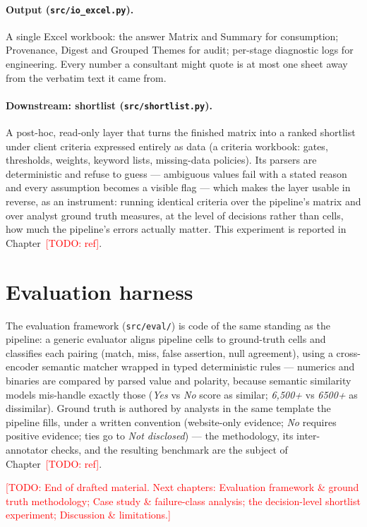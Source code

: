 \documentclass[11pt,a4paper]{report}
\newcommand{\todo}[1]{\textcolor{red}{[TODO: #1]}}
\begin{document}
\paragraph{Output (\texttt{src/io\_excel.py}).} A single Excel workbook:
the answer Matrix and Summary for consumption; Provenance, Digest and
Grouped Themes for audit; per-stage diagnostic logs for engineering. Every
number a consultant might quote is at most one sheet away from the verbatim
text it came from.

\paragraph{Downstream: shortlist (\texttt{src/shortlist.py}).} A post-hoc,
read-only layer that turns the finished matrix into a ranked shortlist under
client criteria expressed entirely as data (a criteria workbook: gates,
thresholds, weights, keyword lists, missing-data policies). Its parsers are
deterministic and refuse to guess --- ambiguous values fail with a stated
reason and every assumption becomes a visible flag --- which makes the layer
usable in reverse, as an instrument: running identical criteria over the
pipeline's matrix and over analyst ground truth measures, at the level of
decisions rather than cells, how much the pipeline's errors actually matter.
This experiment is reported in Chapter~\todo{ref}.

\section{Evaluation harness}
\label{sec:eval-harness}

The evaluation framework (\texttt{src/eval/}) is code of the same standing
as the pipeline: a generic evaluator aligns pipeline cells to ground-truth
cells and classifies each pairing (match, miss, false assertion, null
agreement), using a cross-encoder semantic matcher wrapped in typed
deterministic rules --- numerics and binaries are compared by parsed value
and polarity, because semantic similarity models mis-handle exactly those
(\emph{Yes} vs \emph{No} score as similar; \emph{6{,}500+} vs \emph{6500+}
as dissimilar). Ground truth is authored by analysts in the same template
the pipeline fills, under a written convention (website-only evidence;
\emph{No} requires positive evidence; ties go to \emph{Not disclosed}) ---
the methodology, its inter-annotator checks, and the resulting benchmark
are the subject of Chapter~\todo{ref}.

\todo{End of drafted material. Next chapters: Evaluation framework \&
ground truth methodology; Case study \& failure-class analysis; the
decision-level shortlist experiment; Discussion \& limitations.}
\end{document}
